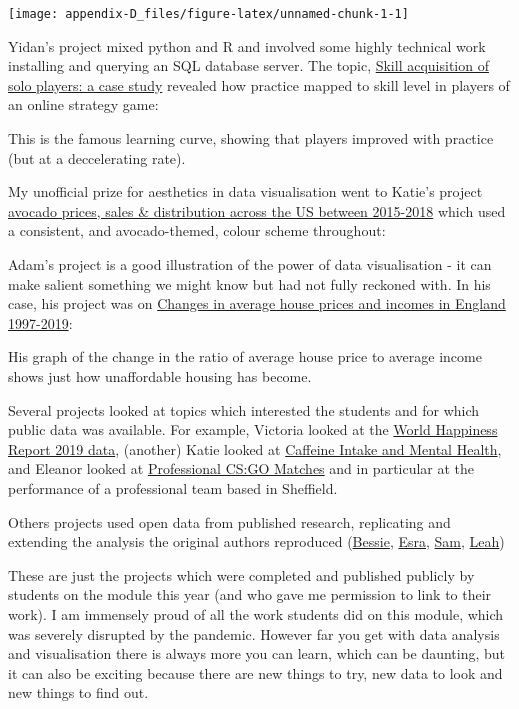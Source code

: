 \documentclass[
]{book}
\begin{document}
\begin{center}\texttt{[image: appendix-D\_files/figure-latex/unnamed-chunk-1-1]} \end{center}

Yidan's project mixed python and R and involved some highly technical work installing and querying an SQL database server. The topic, \href{https://github.com/yidanliu-psy/solo-player-skill/blob/master/visualisation.ipynb}{Skill acquisition of solo players: a case study} revealed how practice mapped to skill level in players of an online strategy game:

This is the famous learning curve, showing that players improved with practice (but at a deccelerating rate).

My unofficial prize for aesthetics in data visualisation went to Katie's project \href{https://katielmoran.github.io/PSY6422}{avocado prices, sales \& distribution across the US between 2015-2018} which used a consistent, and avocado-themed, colour scheme throughout:

Adam's project is a good illustration of the power of data visualisation - it can make salient something we might know but had not fully reckoned with. In his case, his project was on \href{https://adamscott1997.github.io/PSY6422/}{Changes in average house prices and incomes in England 1997-2019}:

His graph of the change in the ratio of average house price to average income shows just how unaffordable housing has become.

Several projects looked at topics which interested the students and for which public data was available. For example, Victoria looked at the \href{https://victoria1403.github.io/PSY6422-Final-Project/}{World Happiness Report 2019 data}, (another) Katie looked at \href{https://kamac-sheff.github.io/Caffeine/Caffeine.html}{Caffeine Intake and Mental Health}, and Eleanor looked at \href{https://eleanorhyde.github.io/}{Professional CS:GO Matches} and in particular at the performance of a professional team based in Sheffield.

Others projects used open data from published research, replicating and extending the analysis the original authors reproduced (\href{https://bessieo.github.io/Looking-At-Others/}{Bessie}, \href{https://ekhojah.github.io/Birthwight/}{Esra}, \href{https://sam-antrobus.github.io/Final_Project/}{Sam}, \href{https://lmcgrath2.github.io/PSY6422project/}{Leah})

These are just the projects which were completed and published publicly by students on the module this year (and who gave me permission to link to their work). I am immensely proud of all the work students did on this module, which was severely disrupted by the pandemic. However far you get with data analysis and visualisation there is always more you can learn, which can be daunting, but it can also be exciting because there are new things to try, new data to look and new things to find out.
\end{document}
